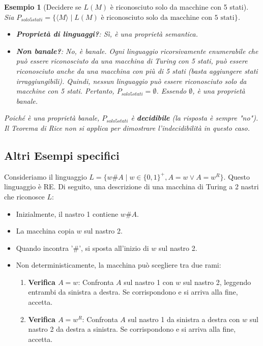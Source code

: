 \documentclass[a4paper, 11pt]{book} %
\newtheorem{example}[theorem]{Esempio}
\theoremstyle{definition}
\begin{document}
\begin{example}[Decidere se $L(M)$ è riconosciuto solo da macchine con 5 stati]
Sia $P_{solo5stati} = \{\langle M \rangle \mid L(M) \text{ è riconosciuto solo da macchine con 5 stati}\}$.
\begin{itemize}
    \item \textbf{Proprietà di linguaggi?}: Sì, è una proprietà semantica.
    \item \textbf{Non banale?}: No, è banale. Ogni linguaggio ricorsivamente enumerabile che può essere riconosciuto da una macchina di Turing con 5 stati, può essere riconosciuto anche da una macchina con più di 5 stati (basta aggiungere stati irraggiungibili). Quindi, nessun linguaggio può essere riconosciuto \emph{solo} da macchine con 5 stati. Pertanto, $P_{solo5stati} = \emptyset$. Essendo $\emptyset$, è una proprietà banale.
\end{itemize}
Poiché è una proprietà banale, $P_{solo5stati}$ è \textbf{decidibile} (la risposta è sempre "no"). Il Teorema di Rice non si applica per dimostrare l'indecidibilità in questo caso.
\end{example}

\subsection{Altri Esempi specifici}

Consideriamo il linguaggio $L = \{w\#A \mid w \in \{0,1\}^+, A=w \lor A=w^R \}$. Questo linguaggio è RE. Di seguito, una descrizione di una macchina di Turing a 2 nastri che riconosce $L$:
\begin{itemize}
    \item Inizialmente, il nastro 1 contiene $w\#A$.
    \item La macchina copia $w$ sul nastro 2.
    \item Quando incontra '\#', si sposta all'inizio di $w$ sul nastro 2.
    \item Non deterministicamente, la macchina può scegliere tra due rami:
        \begin{enumerate}
            \item \textbf{Verifica $A=w$}: Confronta $A$ sul nastro 1 con $w$ sul nastro 2, leggendo entrambi da sinistra a destra. Se corrispondono e si arriva alla fine, accetta.
            \item \textbf{Verifica $A=w^R$}: Confronta $A$ sul nastro 1 da sinistra a destra con $w$ sul nastro 2 da destra a sinistra. Se corrispondono e si arriva alla fine, accetta.
        \end{enumerate}
\end{itemize}
\end{document}
